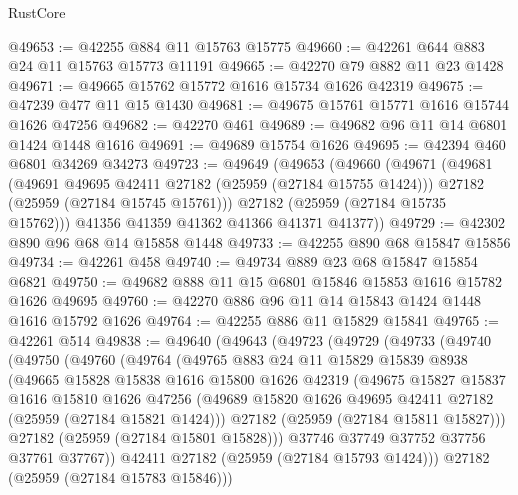 \begin{lexlean}{RustCore}
\begin{coremodule}
@49653 := @42255 @884 @11 @15763 @15775
@49660 := @42261 @644 @883 @24 @11 @15763 @15773 @11191
@49665 := @42270 @79 @882 @11 @23 @1428
@49671 := @49665 @15762 @15772 @1616 @15734 @1626 @42319
@49675 := @47239 @477 @11 @15 @1430
@49681 := @49675 @15761 @15771 @1616 @15744 @1626 @47256
@49682 := @42270 @461
@49689 := @49682 @96 @11 @14 @6801 @1424 @1448 @1616
@49691 := @49689 @15754 @1626
@49695 := @42394 @460 @6801 @34269 @34273
@49723 := @49649
    (@49653
      (@49660
        (@49671
          (@49681
            (@49691 @49695 @42411 @27182 (@25959 (@27184 @15755 @1424)))
            @27182
            (@25959 (@27184 @15745 @15761)))
          @27182
          (@25959 (@27184 @15735 @15762)))
        @41356
        @41359
        @41362
        @41366
        @41371
        @41377))
@49729 := @42302 @890 @96 @68 @14 @15858 @1448
@49733 := @42255 @890 @68 @15847 @15856
@49734 := @42261 @458
@49740 := @49734 @889 @23 @68 @15847 @15854 @6821
@49750 := @49682 @888 @11 @15 @6801 @15846 @15853 @1616 @15782 @1626 @49695
@49760 := @42270 @886 @96 @11 @14 @15843 @1424 @1448 @1616 @15792 @1626
@49764 := @42255 @886 @11 @15829 @15841
@49765 := @42261 @514
@49838 := @49640
    (@49643
      (@49723
        (@49729
          (@49733
            (@49740
              (@49750
                (@49760
                  (@49764
                    (@49765
                      @883
                      @24
                      @11
                      @15829
                      @15839
                      @8938
                      (@49665
                        @15828
                        @15838
                        @1616
                        @15800
                        @1626
                        @42319
                        (@49675
                          @15827
                          @15837
                          @1616
                          @15810
                          @1626
                          @47256
                          (@49689 @15820 @1626 @49695 @42411 @27182 (@25959 (@27184 @15821 @1424)))
                          @27182
                          (@25959 (@27184 @15811 @15827)))
                        @27182
                        (@25959 (@27184 @15801 @15828)))
                      @37746
                      @37749
                      @37752
                      @37756
                      @37761
                      @37767))
                  @42411
                  @27182
                  (@25959 (@27184 @15793 @1424)))
                @27182
                (@25959 (@27184 @15783 @15846)))

\end{coremodule}
\end{lexlean}
